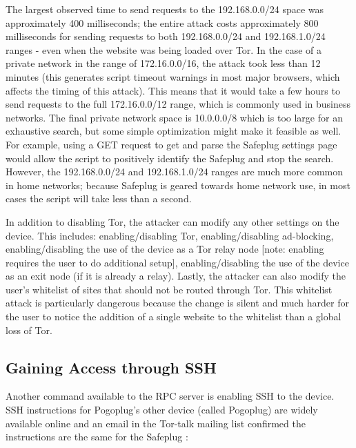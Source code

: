 \documentclass[letterpaper,twocolumn,10pt]{article}
\begin{document}
The largest observed time to send requests to the 192.168.0.0/24 space was approximately 400 milliseconds; the entire attack costs approximately 800 milliseconds for sending requests to both 192.168.0.0/24 and 192.168.1.0/24 ranges - even when the website was being loaded over Tor.  In the case of a private network in the range of 172.16.0.0/16, the attack took less than 12 minutes (this generates script timeout warnings in most major browsers, which affects the timing of this attack).  This means that it would take a few hours to send requests to the full 172.16.0.0/12 range, which is commonly used in business networks.  The final private network space is 10.0.0.0/8 which is too large for an exhaustive search, but some simple optimization might make it feasible as well.  For example, using a GET request to get and parse the Safeplug settings page would allow the script to positively identify the Safeplug and stop the search.  However, the 192.168.0.0/24 and 192.168.1.0/24 ranges are much more common in home networks; because Safeplug is geared towards home network use, in most cases the script will take less than a second.

In addition to disabling Tor, the attacker can modify any other settings on the device.  This includes: enabling/disabling Tor, enabling/disabling ad-blocking, enabling/disabling the use of the device as a Tor relay node [note: enabling requires the user to do additional setup], enabling/disabling the use of the device as an exit node (if it is already a relay).  Lastly, the attacker can also modify the user's whitelist of sites that should not be routed through Tor.  This whitelist attack is particularly dangerous because the change is silent and much harder for the user to notice the addition of a single website to the whitelist than a global loss of Tor.

\subsection{Gaining Access through SSH}
\label{sec:SSH}
    Another command available to the RPC server is enabling SSH to the device.  SSH instructions for Pogoplug's other device (called Pogoplug) are widely available online and an email in the Tor-talk mailing list confirmed the instructions are the same for the Safeplug \cite{ceadmin}:
\end{document}
